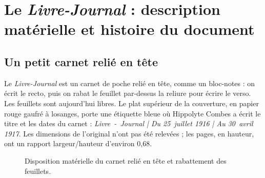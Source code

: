 \section{Le \textit{Livre-Journal} : description matérielle et histoire du document}

\subsection{Un petit carnet relié en tête}

Le \textit{Livre-Journal} est un carnet de poche relié en tête, comme un bloc-notes : on écrit le recto, puis on rabat le feuillet par-dessus la reliure pour écrire le verso. Les feuillets sont aujourd'hui libres. Le plat supérieur de la couverture, en papier rouge gaufré à losanges, porte une étiquette bleue où Hippolyte Combes a écrit le titre et les dates du carnet : \textit{Livre~-~Journal | Du 25~juillet 1916 | Au 30~avril 1917}. Les dimensions de l'original n'ont pas été relevées ; les pages, en hauteur, ont un rapport largeur/hauteur d'environ 0,68.

\begin{figure}[ht]
\centering
{}
\caption{Disposition matérielle du carnet relié en tête et rabattement des feuillets.}
\end{figure}

